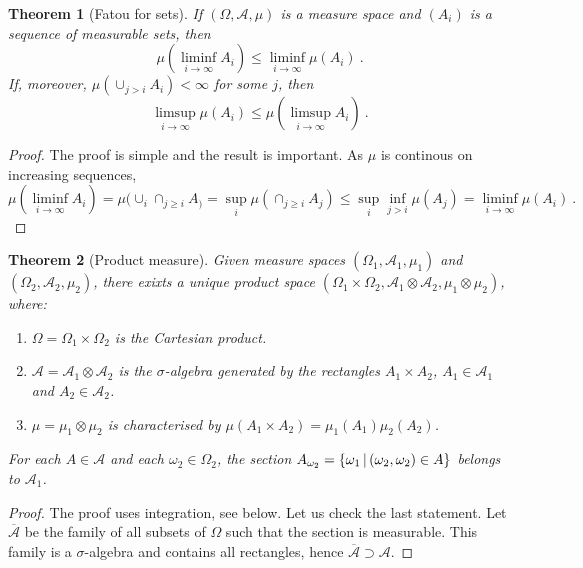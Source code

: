 \documentclass[12pt,a4paper]{amsart}
\theoremstyle{plain}
\newtheorem{theorem}{Theorem}%
\theoremstyle{definition}
\theoremstyle{remark}
\begin{document}
\begin{theorem}[Fatou for sets]
If $(\Omega,\mathcal A,\mu)$ is a measure space and $(A_i)$ is a
sequence of measurable sets, then
\begin{equation*}
  \mu(\liminf_{i\to\infty} A_i) \leq \liminf_{i\to\infty} \mu(A_i) \ .
\end{equation*}
If, moreover, $\mu(\cup_{j > i} A_i) < \infty$ for some $j$, then
\begin{equation*}
  \limsup_{i\to\infty} \mu(A_i) \leq \mu(\limsup_{i\to\infty} A_i) \ .
\end{equation*}
\end{theorem}

\begin{proof} The proof is simple and the result is important. As
  $\mu$ is continous on increasing sequences,
  \begin{equation*}
\mu(\liminf_{i\to\infty} A_i) = \mu(\cup_i \cap_{j\ge i} A_) = \sup_i
\mu(\cap_{j \geq i} A_j) \leq \sup_i \inf_{j > i} \mu(A_j) =
\liminf_{i\to\infty} \mu(A_i) \ .   
  \end{equation*}
\end{proof}

\begin{theorem}[Product measure] Given measure spaces
  $(\Omega_1,\mathcal A_1,\mu_1)$ and $(\Omega_2,\mathcal A_2,\mu_2)$,
  there exixts a unique \emph{product space} $(\Omega_1 \times
  \Omega_2, \mathcal A_1 \otimes \mathcal A_2, \mu_1 \otimes \mu_2)$, where:
  \begin{enumerate}
  \item $\Omega = \Omega_1 \times \Omega _2$ is the Cartesian product.
  \item $\mathcal A = \mathcal A_1 \otimes \mathcal A_2$ is the
    $\sigma$-algebra generated by the rectangles $A_1 \times A_2$,
    $A_1 \in \mathcal A_1$ and $A_2 \in \mathcal A_2$. 
  \item $\mu = \mu_1 \otimes \mu_2$ is characterised by $\mu(A_1
    \times A_2) = \mu_1(A_1) \mu_2(A_2)$.
  \end{enumerate}
For each $A \in \mathcal A$ and each $\omega_2 \in \Omega_2$, the
section $A_{\omega_2} = \left\{\omega_1 \, \middle| \, (\omega_2,\omega_2) \in A \right\}$
belongs to $\mathcal A_1$.
\end{theorem}

\begin{proof}
  The proof uses integration, see below. Let us check the last
  statement. Let $\overline {\mathcal A}$ be the family of all subsets of
  $\Omega$ such that the section is measurable. This family is a
  $\sigma$-algebra and contains all rectangles, hence $\overline {\mathcal A}
  \supset \mathcal A$.
\end{proof}
\end{document}
